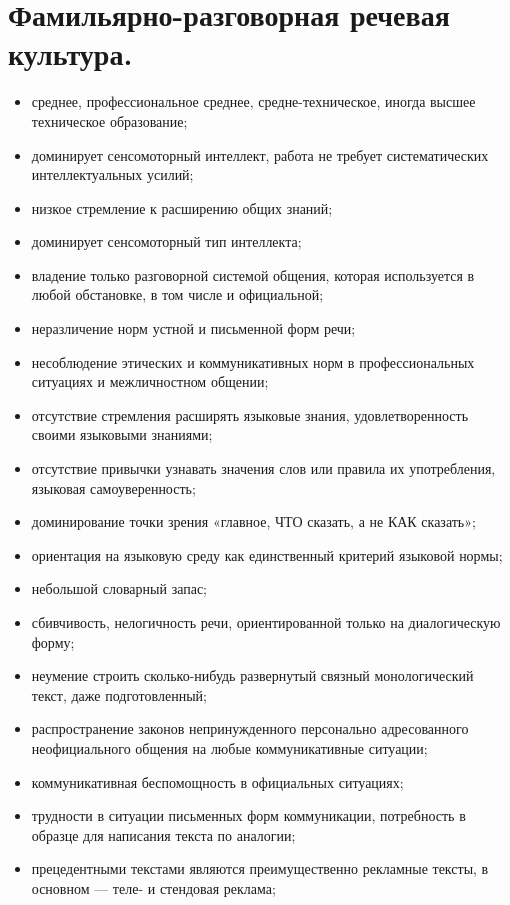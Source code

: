 \section{Фамильярно-разговорная речевая культура.}

\begin{itemize}
    \item среднее, профессиональное среднее, средне-техническое, иногда высшее техническое образование;
    \item доминирует сенсомоторный интеллект, работа не требует систематических интеллектуальных усилий;
    \item низкое стремление к расширению общих знаний;
    \item доминирует сенсомоторный тип интеллекта;
    \item владение только разговорной системой общения, которая используется в любой обстановке, в том числе и официальной;
    \item неразличение норм устной и письменной форм речи;
    \item несоблюдение этических и коммуникативных норм в профессиональных ситуациях и межличностном общении;
    \item отсутствие стремления расширять языковые знания, удовлетворенность своими языковыми знаниями;
    \item отсутствие привычки узнавать значения слов или правила их употребления, языковая самоуверенность;
    \item доминирование точки зрения «главное, ЧТО сказать, а не КАК сказать»;
    \item ориентация на языковую среду как единственный критерий языковой нормы;
    \item небольшой словарный запас;
    \item сбивчивость, нелогичность речи, ориентированной только на диалогическую форму;
    \item неумение строить сколько-нибудь развернутый связный монологический текст, даже подготовленный;
    \item распространение законов непринужденного персонально адресованного неофициального общения на любые коммуникативные ситуации;
    \item коммуникативная беспомощность в официальных ситуациях;
    \item трудности в ситуации письменных форм коммуникации, потребность в образце для написания текста по аналогии;
    \item прецедентными текстами являются преимущественно рекламные тексты, в основном --- теле- и стендовая реклама;

\end{itemize}
